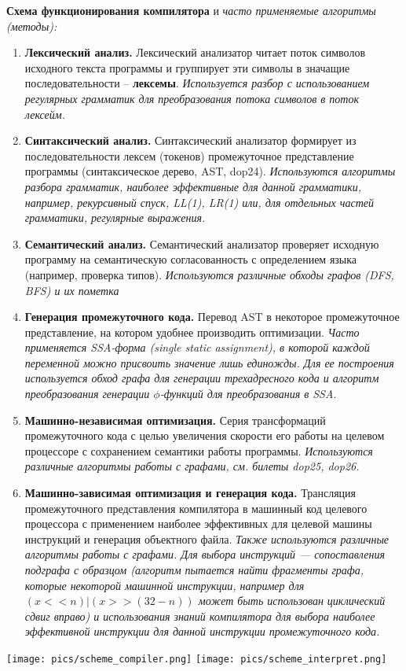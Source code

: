 \textbf{Схема функционирования компилятора} и \textit{часто применяемые алгоритмы (методы):}
\begin{enumerate}
    \item \textbf{Лексический анализ.} Лексический анализатор читает поток символов исходного текста программы и группирует эти символы в значащие последовательности -- \textbf{лексемы}.
    \textit{Используется разбор с использованием регулярных грамматик для преобразования потока символов в поток лексейм.}
    \item \textbf{Синтаксический анализ.} Синтаксический анализатор формирует из последовательности лексем (токенов) промежуточное представление программы (синтаксическое дерево, AST, dop24).
    	\textit{Используются алгоритмы разбора грамматик, наиболее эффективные для данной грамматики, например, рекурсивный спуск, LL(1), LR(1) или, для отдельных частей грамматики, регулярные выражения.}
    \item \textbf{Семантический анализ.} Семантический анализатор проверяет исходную программу на семантическую согласованность с определением языка (например, проверка типов). \textit{Используются различные обходы графов (DFS, BFS) и их пометка}
    \item \textbf{Генерация промежуточного кода.} Перевод AST в некоторое промежуточное представление, на котором удобнее производить оптимизации.
    	\textit{Часто применяется SSA-форма (single static assignment), в которой каждой переменной можно присвоить значение лишь единожды. Для ее построения используется обход графа для генерации трехадресного кода и алгоритм преобразования генерации $\phi$-функций для преобразования в SSA.}
    \item \textbf{Машинно-независимая оптимизация.} Серия трансформаций промежуточного кода с целью увеличения скорости его работы на целевом процессоре с сохранением семантики работы программы.
    	\textit{Используются различные алгоритмы работы с графами, см. билеты dop25, dop26.}
    \item \textbf{Машинно-зависимая оптимизация и генерация кода.} Трансляция промежуточного представления компилятора в машинный код целевого процессора с применением наиболее эффективных для целевой машины инструкций и генерация объектного файла. \textit{Также используются различные алгоритмы работы с графами. Для выбора инструкций --- сопоставления подграфа с образцом (алгоритм пытается найти фрагменты графа, которые некоторой машинной инструкции, например для \texttt{$(x << n) | (x >> (32 - n))$} может быть использован циклический сдвиг вправо) и использования знаний компилятора для выбора наиболее эффективной инструкции для данной инструкции промежуточного кода.}
\end{enumerate}

\texttt{[image: pics/scheme\_compiler.png]}%
\texttt{[image: pics/scheme\_interpret.png]}

